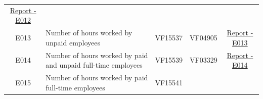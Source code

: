 \documentclass[]{book}
\begin{document}
\begin{longtable}[]{@{}clccc@{}}
\begin{minipage}[t]{0.20\columnwidth}
\href{./Auxiliary\%20Files/technical_reports/variable_report/E012.pdf}{Report - E012}\strut
\end{minipage}\tabularnewline
\begin{minipage}[t]{0.10\columnwidth}\centering
E013\strut
\end{minipage} & \begin{minipage}[t]{0.25\columnwidth}\raggedright
Number of hours worked by unpaid employees\strut
\end{minipage} & \begin{minipage}[t]{0.12\columnwidth}\centering
VF15537\strut
\end{minipage} & \begin{minipage}[t]{0.19\columnwidth}\centering
VF04905\strut
\end{minipage} & \begin{minipage}[t]{0.20\columnwidth}\centering
\href{./Auxiliary\%20Files/technical_reports/variable_report/E013.pdf}{Report - E013}\strut
\end{minipage}\tabularnewline
\begin{minipage}[t]{0.10\columnwidth}\centering
E014\strut
\end{minipage} & \begin{minipage}[t]{0.25\columnwidth}\raggedright
Number of hours worked by paid and unpaid full-time employees\strut
\end{minipage} & \begin{minipage}[t]{0.12\columnwidth}\centering
VF15539\strut
\end{minipage} & \begin{minipage}[t]{0.19\columnwidth}\centering
VF03329\strut
\end{minipage} & \begin{minipage}[t]{0.20\columnwidth}\centering
\href{./Auxiliary\%20Files/technical_reports/variable_report/E014.pdf}{Report - E014}\strut
\end{minipage}\tabularnewline
\begin{minipage}[t]{0.10\columnwidth}\centering
E015\strut
\end{minipage} & \begin{minipage}[t]{0.25\columnwidth}\raggedright
Number of hours worked by paid full-time employees\strut
\end{minipage} & \begin{minipage}[t]{0.12\columnwidth}\centering
VF15541\strut
\end{minipage} & \begin{minipage}[t]{0.19\columnwidth}\centering

\end{minipage}
\end{longtable}
\end{document}

